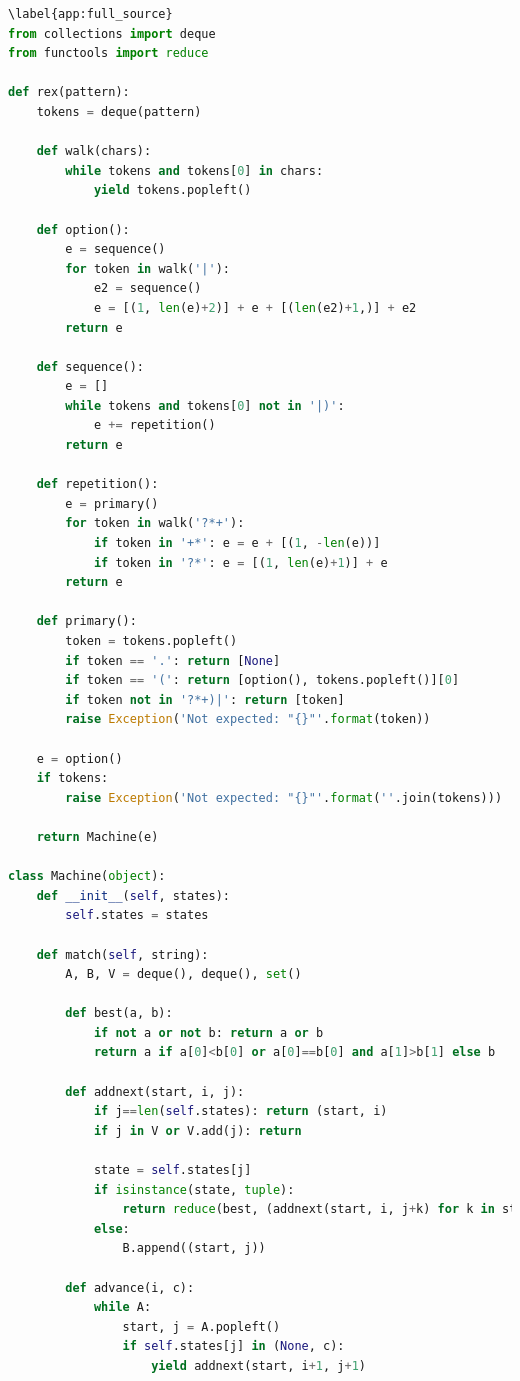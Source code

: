 \documentclass[a4paper,12pt,oneside,onecolumn]{uerj}
\begin{document}
\begin{lstlisting}[language=python]
\label{app:full_source}
from collections import deque
from functools import reduce

def rex(pattern):
    tokens = deque(pattern)

    def walk(chars):
        while tokens and tokens[0] in chars:
            yield tokens.popleft()

    def option():
        e = sequence()
        for token in walk('|'):
            e2 = sequence()
            e = [(1, len(e)+2)] + e + [(len(e2)+1,)] + e2
        return e        

    def sequence():
        e = []
        while tokens and tokens[0] not in '|)':
            e += repetition()
        return e
        
    def repetition():
        e = primary()
        for token in walk('?*+'):
            if token in '+*': e = e + [(1, -len(e))]
            if token in '?*': e = [(1, len(e)+1)] + e
        return e
        
    def primary():
        token = tokens.popleft()
        if token == '.': return [None]
        if token == '(': return [option(), tokens.popleft()][0]
        if token not in '?*+)|': return [token]
        raise Exception('Not expected: "{}"'.format(token))

    e = option()
    if tokens: 
        raise Exception('Not expected: "{}"'.format(''.join(tokens)))

    return Machine(e)
                
class Machine(object):
    def __init__(self, states):
        self.states = states
        
    def match(self, string):
        A, B, V = deque(), deque(), set()
             
        def best(a, b):
            if not a or not b: return a or b
            return a if a[0]<b[0] or a[0]==b[0] and a[1]>b[1] else b
                
        def addnext(start, i, j):
            if j==len(self.states): return (start, i)
            if j in V or V.add(j): return

            state = self.states[j]
            if isinstance(state, tuple):
                return reduce(best, (addnext(start, i, j+k) for k in state))
            else:
                B.append((start, j))
        
        def advance(i, c):
            while A:
                start, j = A.popleft()
                if self.states[j] in (None, c):
                    yield addnext(start, i+1, j+1)
        

\end{lstlisting}
\end{document}
